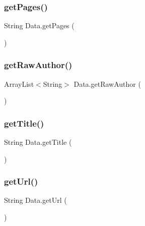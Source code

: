 \hypertarget{class_data_a7c34cb99f132d8fb526462d59a033aa8}{}\label{class_data_a7c34cb99f132d8fb526462d59a033aa8} 
\subsubsection{\texorpdfstring{get\+Pages()}{getPages()}}
{\footnotesize\ttfamily String Data.\+get\+Pages (\begin{DoxyParamCaption}{ }\end{DoxyParamCaption})}

\hypertarget{class_data_a3e01a97f8e6695e9ae4bbdfb4e012127}{}\label{class_data_a3e01a97f8e6695e9ae4bbdfb4e012127} 
\subsubsection{\texorpdfstring{get\+Raw\+Author()}{getRawAuthor()}}
{\footnotesize\ttfamily Array\+List$<$String$>$ Data.\+get\+Raw\+Author (\begin{DoxyParamCaption}{ }\end{DoxyParamCaption})}

\hypertarget{class_data_abed831f7e25a9173f7120dbf9bbac2bd}{}\label{class_data_abed831f7e25a9173f7120dbf9bbac2bd} 
\subsubsection{\texorpdfstring{get\+Title()}{getTitle()}}
{\footnotesize\ttfamily String Data.\+get\+Title (\begin{DoxyParamCaption}{ }\end{DoxyParamCaption})}

\hypertarget{class_data_ae19e8172a648699e26eceab342383e4d}{}\label{class_data_ae19e8172a648699e26eceab342383e4d} 
\subsubsection{\texorpdfstring{get\+Url()}{getUrl()}}
{\footnotesize\ttfamily String Data.\+get\+Url (\begin{DoxyParamCaption}{ }\end{DoxyParamCaption})}

